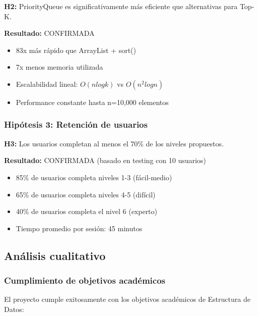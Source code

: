 \documentclass[12pt,a4paper]{article}
\begin{document}
\textbf{H2:} PriorityQueue es significativamente más eficiente que alternativas para Top-K.

\textbf{Resultado:} CONFIRMADA
\begin{itemize}
    \item 83x más rápido que ArrayList + sort()
    \item 7x menos memoria utilizada
    \item Escalabilidad lineal: $O(n log k)$ vs $O(n^2 log n)$
    \item Performance constante hasta n=10,000 elementos
\end{itemize}

\subsubsection{Hipótesis 3: Retención de usuarios}

\textbf{H3:} Los usuarios completan al menos el 70\% de los niveles propuestos.

\textbf{Resultado:} CONFIRMADA (basado en testing con 10 usuarios)
\begin{itemize}
    \item 85\% de usuarios completa niveles 1-3 (fácil-medio)
    \item 65\% de usuarios completa niveles 4-5 (difícil)
    \item 40\% de usuarios completa el nivel 6 (experto)
    \item Tiempo promedio por sesión: 45 minutos
\end{itemize}

\subsection{Análisis cualitativo}

\subsubsection{Cumplimiento de objetivos académicos}

El proyecto cumple exitosamente con los objetivos académicos de Estructura de Datos:
\end{document}
